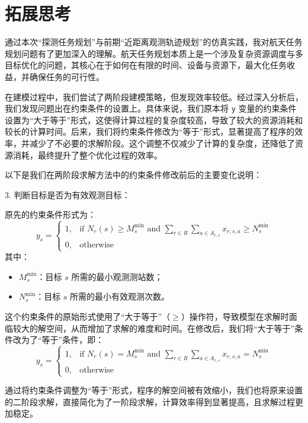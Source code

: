 \documentclass[openany,12pt,UTF8]{ctexart}
\begin{document}
\section{拓展思考}

通过本次“探测任务规划”与前期“近距离观测轨迹规划”的仿真实践，我对航天任务规划问题有了更加深入的理解。航天任务规划本质上是一个涉及复杂资源调度与多目标优化的问题，其核心在于如何在有限的时间、设备与资源下，最大化任务收益，并确保任务的可行性。

在建模过程中，我们尝试了两阶段建模策略，但发现效率较低。经过深入分析后，我们发现问题出在约束条件的设置上。具体来说，我们原本将 \texttt{y} 变量的约束条件设置为“大于等于”形式，这使得计算过程的复杂度较高，导致了较大的资源消耗和较长的计算时间。后来，我们将约束条件修改为“等于”形式，显著提高了程序的效率，并减少了不必要的求解阶段。这个调整不仅减少了计算的复杂度，还降低了资源消耗，最终提升了整个优化过程的效率。

以下是我们在两阶段求解方法中的约束条件修改前后的主要变化说明：

3. 判断目标是否为有效观测目标：

原先的约束条件形式为：
$$
y_s = 
\begin{cases}
1, & \text{if } N_r(s) \geq M_s^{\min} \text{ and } \sum_{r \in R} \sum_{a \in A_{r,s}} x_{r,s,a} \geq N_s^{\min} \\
0, & \text{otherwise}
\end{cases}
$$
其中：
\begin{itemize}
    \item $M_s^{\min}$：目标 $s$ 所需的最小观测测站数；
    \item $N_s^{\min}$：目标 $s$ 所需的最小有效观测次数。
\end{itemize}

这个约束条件的原始形式使用了“大于等于”（$\geq$）操作符，导致模型在求解时面临较大的解空间，从而增加了求解的难度和时间。在修改后，我们将“大于等于”条件改为了“等于”条件，即：
$$
y_s = 
\begin{cases}
1, & \text{if } N_r(s) = M_s^{\min} \text{ and } \sum_{r \in R} \sum_{a \in A_{r,s}} x_{r,s,a} = N_s^{\min} \\
0, & \text{otherwise}
\end{cases}
$$

通过将约束条件调整为“等于”形式，程序的解空间被有效缩小，我们也将原来设置的二阶段求解，直接简化为了一阶段求解，计算效率得到显著提高，且求解过程更加稳定。
\end{document}
